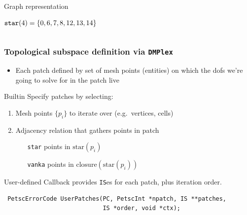 \documentclass[presentation,aspectratio=43,10pt]{beamer}
\begin{document}
\begin{frame}[t]
\begin{columns}[T]
\begin{column}{0.6\textwidth}
\begin{block}{Graph representation}
\begin{onlyenv}
\begin{center}
          \end{center}
          $\text{\texttt{star}}(4) = \{0, 6, 7, 8, 12, 13, 14\}$
        \end{onlyenv}
      \end{block}
    \end{column}
  \end{columns}
\end{frame}

\begin{frame}[fragile]
 \frametitle{Topological subspace definition via \texttt{DMPlex}}
 \begin{itemize}
 \item Each patch defined by set of mesh points (entities) on which the dofs
   we're going to solve for in the patch live
 \end{itemize}
 \begin{block}{Builtin}
   Specify patches by selecting:
   \begin{enumerate}
   \item Mesh points $\{p_i\}$ to iterate over (e.g.~vertices, cells)
   \item Adjacency relation that gathers points in patch
     \begin{itemize}
     \item[\texttt{star}] points in $\text{star}(p_i)$
     \item[\texttt{vanka}] points in $\text{closure}(\text{star}(p_i))$
     \end{itemize}
   \end{enumerate}
 \end{block}
 \begin{block}{User-defined}
   Callback provides \texttt{IS}es for each patch, plus iteration order.
\begin{verbatim}
 PetscErrorCode UserPatches(PC, PetscInt *npatch, IS **patches, 
                            IS *order, void *ctx);
\end{verbatim}
 \end{block}
\end{frame}
\end{document}
